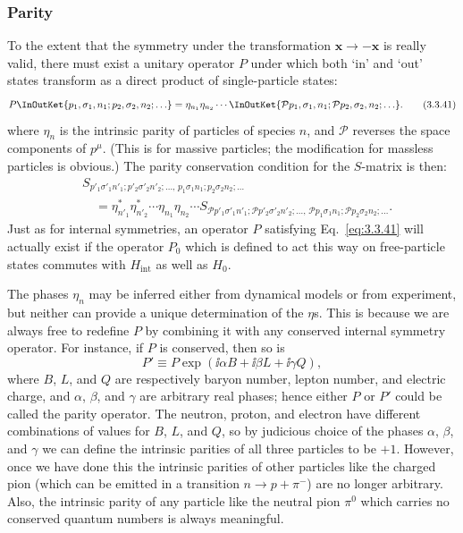 \subsubsection*{Parity}

To the extent that the symmetry under the transformation $\mathbf{x}\to-\mathbf{x}$
is really valid, there must exist a unitary operator $P$ under which both `in' and
`out' states transform as a direct product of single-particle states:
\begin{equation}
P\InOutKet{p_1,\sigma_1,n_1;p_2,\sigma_2,n_2;\ldots}
=\eta_{n_1}\eta_{n_2}\cdots
\InOutKet{\mathcal{P}p_1,\sigma_1,n_1;\mathcal{P}p_2,\sigma_2,n_2;\ldots}.
\tag{3.3.41}\label{eq:3.3.41}
\end{equation}
where $\eta_n$ is the intrinsic parity of particles of species $n$, and $\mathcal{P}$
reverses the space components of $p^\mu$. (This is for massive particles; the
modification for massless particles is obvious.) The parity conservation condition
for the $S$-matrix is then:
\begin{align}
&S_{p'_1\sigma'_1n'_1;p'_2\sigma'_2n'_2;\ldots,\,
p_1\sigma_1n_1;p_2\sigma_2n_2;\ldots}
\nonumber\\
&\quad=\eta^*_{n'_1}\eta^*_{n'_2}\cdots\eta_{n_1}\eta_{n_2}\cdots
S_{\mathcal{P}p'_1\sigma'_1n'_1;\mathcal{P}p'_2\sigma'_2n'_2;\ldots,\,
\mathcal{P}p_1\sigma_1n_1;\mathcal{P}p_2\sigma_2n_2;\ldots}.
\tag{3.3.42}\label{eq:3.3.42}
\end{align}
Just as for internal symmetries, an operator $P$ satisfying Eq.~\eqref{eq:3.3.41} will
actually exist if the operator $P_0$ which is defined to act this way on
free-particle states commutes with $H_{\mathrm{int}}$ as well as $H_0$.

The phases $\eta_n$ may be inferred either from dynamical models or from experiment,
but neither can provide a unique determination of the $\eta$s. This is because we are
always free to redefine $P$ by combining it with any conserved internal symmetry
operator. For instance, if $P$ is conserved, then so is
\[
P'\equiv P\exp(\ii\alpha B+\ii\beta L+\ii\gamma Q),
\]
where $B$, $L$, and $Q$ are respectively baryon number, lepton number, and electric
charge, and $\alpha$, $\beta$, and $\gamma$ are arbitrary real phases; hence either
$P$ or $P'$ could be called the parity operator. The neutron, proton, and electron
have different combinations of values for $B$, $L$, and $Q$, so by judicious choice
of the phases $\alpha$, $\beta$, and $\gamma$ we can define the intrinsic parities of
all three particles to be $+1$. However, once we have done this the intrinsic parities
of other particles like the charged pion (which can be emitted in a transition
$n\to p+\pi^-$) are no longer arbitrary. Also, the intrinsic parity of any particle
like the neutral pion $\pi^0$ which carries no conserved quantum numbers is always
meaningful.

